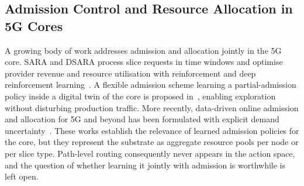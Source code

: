 \documentclass[10pt,journal,comsoc]{IEEEtran}
\begin{document}
\subsection{Admission Control and Resource Allocation in 5G Cores}
A growing body of work addresses admission and allocation jointly in the
5G core. SARA and DSARA process slice requests in time windows and
optimise provider revenue and resource utilisation with reinforcement
and deep reinforcement learning~\cite{villota2022admission}. A flexible
admission scheme learning a partial-admission policy inside a digital
twin of the core is proposed in~\cite{wang2024fsac}, enabling exploration
without disturbing production traffic. More recently, data-driven online
admission and allocation for 5G and beyond has been formulated with
explicit demand uncertainty~\cite{sulaiman2025datadriven}. These works
establish the relevance of learned admission policies for the core, but
they represent the substrate as aggregate resource pools per node or per
slice type. Path-level routing consequently never appears in the action
space, and the question of whether learning it jointly with admission is
worthwhile is left open.
\end{document}
